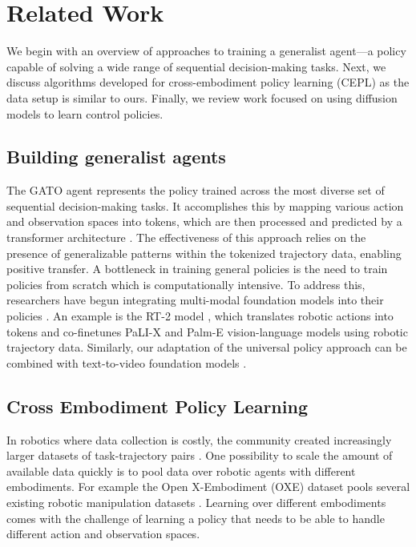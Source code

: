 \section{Related Work}
We begin with an overview of approaches to training a generalist agent—a policy capable of solving a wide range of sequential decision-making tasks. Next, we discuss algorithms developed for cross-embodiment policy learning (CEPL) as the data setup is similar to ours. Finally, we review work focused on using diffusion models to learn control policies.

\subsection{Building generalist agents}

The GATO agent \cite{gato} represents the policy trained across the most diverse set of sequential decision-making tasks. It accomplishes this by mapping various action and observation spaces into tokens, which are then processed and predicted by a transformer architecture \cite{attention}. The effectiveness of this approach relies on the presence of generalizable patterns within the tokenized trajectory data, enabling positive transfer. A bottleneck in training general policies is the need to train policies from scratch which is computationally intensive. To address this, researchers have begun integrating multi-modal foundation models \cite{gpt_4,palm_e,pali_x} into their policies \cite{say_can,fm_seq_decision_making,rt2}. An example is the RT-2 model \cite{rt2}, which translates robotic actions into tokens and co-finetunes PaLI-X \cite{pali_x} and Palm-E \cite{palm_e} vision-language models using robotic trajectory data. Similarly, our adaptation of the universal policy approach can be combined with text-to-video foundation models \cite{sora_world_model1,imagen_video}.

\subsection{Cross Embodiment Policy Learning}

In robotics where data collection is costly, the community created increasingly larger datasets of task-trajectory pairs \cite{language_table,robonet,droid,open_e_dataset}. One possibility to scale the amount of available data quickly is to pool data over robotic agents with different embodiments. For example the Open X-Embodiment (OXE) dataset pools several existing robotic manipulation datasets \cite{open_e_dataset}. Learning over different embodiments comes with the challenge of learning a policy that needs to be able to handle different action and observation spaces.

